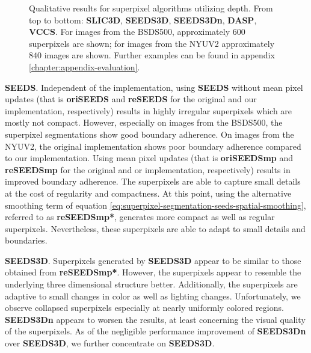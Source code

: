 \begin{figure}[t]
{	}
	\caption[Qualitative results for an extension of \textbf{SEEDS} \cite{VanDenBerghBoixRoigCapitaniVanGool:2012} using depth information, \textbf{DASP} \cite{WeikersdorferGossowBeetz:2012} and \textbf{VCCS} \cite{PaponAbramovSchoelerWoergoetter:2013} on images from the NYU Depth Dataset \cite{SilbermanHoiemKohliFergus:2012}.]{Qualitative results for superpixel algorithms utilizing depth. From top to bottom: \textbf{SLIC3D}, \textbf{SEEDS3D}, \textbf{SEEDS3Dn}, \textbf{DASP}, \textbf{VCCS}. For images from the BSDS500, approximately $600$ superpixels are shown; for images from the NYUV2 approximately $840$ images are shown. Further examples can be found in appendix \ref{chapter:appendix-evaluation}.}
	\label{fig:evaluation-qualitative-depth}
\end{figure}
\textbf{SEEDS}. Independent of the implementation, using \textbf{SEEDS} without mean pixel updates (that is \textbf{oriSEEDS} and \textbf{reSEEDS} for the original and our implementation, respectively) results in highly irregular superpixels which are mostly not compact. However, especially on images from the BSDS500, the superpixel segmentations show good boundary adherence. On images from the NYUV2, the original implementation shows poor boundary adherence compared to our implementation. Using mean pixel updates (that is \textbf{oriSEEDSmp} and \textbf{reSEEDSmp} for the original and or implementation, respectively) results in improved boundary adherence. The superpixels are able to capture small details at the cost of regularity and compactness. At this point, using the alternative smoothing term of equation \eqref{eq:superpixel-segmentation-seeds-spatial-smoothing}, referred to as \textbf{reSEEDSmp*}, generates more compact as well as regular superpixels. Nevertheless, these superpixels are able to adapt to small details and boundaries. 

\textbf{SEEDS3D}. Superpixels generated by \textbf{SEEDS3D} appear to be similar to those obtained from \textbf{reSEEDSmp*}. However, the superpixels appear to resemble the underlying three dimensional structure better. Additionally, the superpixels are adaptive to small changes in color as well as lighting changes. Unfortunately, we observe collapsed superpixels especially at nearly uniformly colored regions. \textbf{SEEDS3Dn} appears to worsen the results, at least concerning the visual quality of the superpixels. As of the negligible performance improvement of \textbf{SEEDS3Dn} over \textbf{SEEDS3D}, we further concentrate on \textbf{SEEDS3D}.

